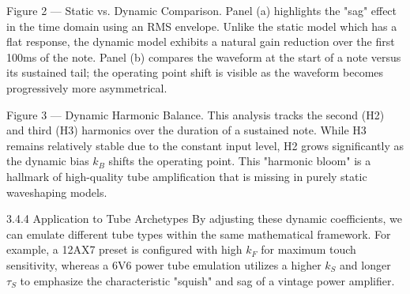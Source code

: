 Figure 2 — Static vs. Dynamic Comparison. Panel (a) highlights the "sag" effect in the time domain using an RMS envelope. Unlike the static model which has a flat response, the dynamic model exhibits a natural gain reduction over the first 100ms of the note. Panel (b) compares the waveform at the start of a note versus its sustained tail; the operating point shift is visible as the waveform becomes progressively more asymmetrical.

Figure 3 — Dynamic Harmonic Balance. This analysis tracks the second (H2) and third (H3) harmonics over the duration of a sustained note. While H3 remains relatively stable due to the constant input level, H2 grows significantly as the dynamic bias $k_B$ shifts the operating point. This "harmonic bloom" is a hallmark of high-quality tube amplification that is missing in purely static waveshaping models.

3.4.4 Application to Tube Archetypes
By adjusting these dynamic coefficients, we can emulate different tube types within the same mathematical framework. For example, a 12AX7 preset is configured with high $k_F$ for maximum touch sensitivity, whereas a 6V6 power tube emulation utilizes a higher $k_S$ and longer $\tau_S$ to emphasize the characteristic "squish" and sag of a vintage power amplifier.
